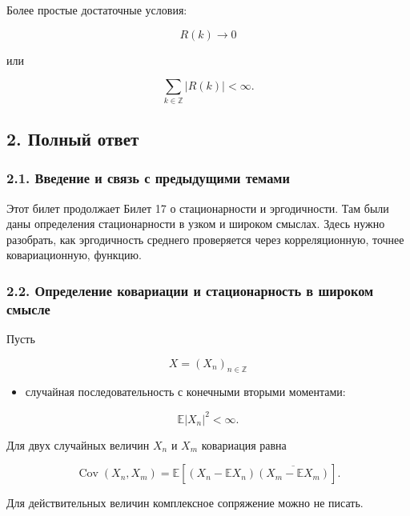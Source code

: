 \documentclass[
  11pt,
  a4paper,
]{article}
\providecommand{\tightlist}{%
  \setlength{\itemsep}{0pt}\setlength{\parskip}{0pt}}
\begin{document}
Более простые достаточные условия:

\[
R(k)\to0
\]

или

\[
\sum_{k\in\mathbb Z}|R(k)|<\infty.
\]

\subsection{2. Полный
ответ}\label{ux43fux43eux43bux43dux44bux439-ux43eux442ux432ux435ux442}

\subsubsection{2.1. Введение и связь с предыдущими
темами}\label{ux432ux432ux435ux434ux435ux43dux438ux435-ux438-ux441ux432ux44fux437ux44c-ux441-ux43fux440ux435ux434ux44bux434ux443ux449ux438ux43cux438-ux442ux435ux43cux430ux43cux438}

Этот билет продолжает Билет 17 о стационарности и эргодичности. Там были
даны определения стационарности в узком и широком смыслах. Здесь нужно
разобрать, как эргодичность среднего проверяется через корреляционную,
точнее ковариационную, функцию.

\subsubsection{2.2. Определение ковариации и стационарность в широком
смысле}\label{ux43eux43fux440ux435ux434ux435ux43bux435ux43dux438ux435-ux43aux43eux432ux430ux440ux438ux430ux446ux438ux438-ux438-ux441ux442ux430ux446ux438ux43eux43dux430ux440ux43dux43eux441ux442ux44c-ux432-ux448ux438ux440ux43eux43aux43eux43c-ux441ux43cux44bux441ux43bux435}

Пусть

\[
X=(X_n)_{n\in\mathbb Z}
\]

\begin{itemize}
\tightlist
\item
  случайная последовательность с конечными вторыми моментами:
\end{itemize}

\[
\mathbb E|X_n|^2<\infty.
\]

Для двух случайных величин \(X_n\) и \(X_m\) ковариация равна

\[
\operatorname{Cov}(X_n,X_m)
=
\mathbb E[(X_n-\mathbb EX_n)\overline{(X_m-\mathbb EX_m)}].
\]

Для действительных величин комплексное сопряжение можно не писать.
\end{document}
